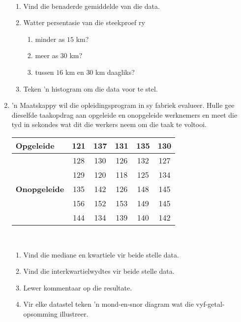 \begin{eocexercises}{}
\begin{enumerate}[itemsep=6pt, label=\textbf{\arabic*}.]
\begin{center}
\begin{tabular}{|c|c|}
      \end{tabular}
    \end{center}
\vspace {8pt}\\
     \begin{enumerate}[noitemsep, label=\textbf{(\alph*)} ]
    \item Vind die benaderde gemiddelde van die data.
    \item Watter persentasie van die steekproef ry 
      \begin{enumerate}[noitemsep, label=\textbf{\roman*}. ]
      \item minder as $15$ km?
      \item meer as $30$ km?
      \item tussen $16$ km en $30$ km daagliks?
      \end{enumerate}
\item Teken 'n histogram om die data voor te stel.
    \end{enumerate}

  \item ’n Maatskappy wil die opleidingsprogram in sy fabriek evalueer. Hulle gee dieselfde taakopdrag aan opgeleide en onopgeleide werknemers en meet die tyd in sekondes wat  dit die werkers neem om die taak te voltooi. 
\\
    \begin{center}
      \begin{tabular}{|l|c|c|c|c|c|} \hline

        \textbf{Opgeleide} & 121 & 137 & 131 & 135 & 130 \\ \hline
                         & 128 & 130 & 126 & 132 & 127 \\\hline
                         & 129 & 120 & 118 & 125 & 134 \\\hline

        \textbf{Onopgeleide} & 135 & 142 & 126 & 148 & 145 \\\hline
                           & 156 & 152 & 153 & 149 & 145 \\\hline
                           & 144 & 134 & 139 & 140 & 142 \\\hline

      \end{tabular}
    \end{center}
\vspace {8pt}\\
    \begin{enumerate}[noitemsep, label=\textbf{(\alph*)} ]
    \item Vind die mediane en kwartiele vir beide stelle data.
    \item Vind die interkwartielwydtes vir beide stelle data.
    \item Lewer kommentaar op die resultate.
\item Vir elke datastel teken 'n mond-en-snor diagram wat die vyf-getal-opsomming illustreer.
    \end{enumerate}


\end{enumerate}
\end{eocexercises}
